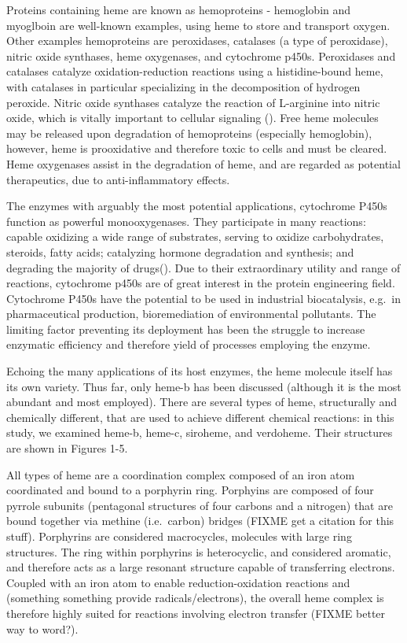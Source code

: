 \documentclass[a4paper, nobind]{templates/ociamthesis}
\begin{document}
Proteins containing heme are known as hemoproteins - hemoglobin and myoglboin are well-known examples, using heme to store and transport oxygen. Other examples hemoproteins are peroxidases, catalases (a type of peroxidase), nitric oxide synthases, heme oxygenases, and cytochrome p450s. Peroxidases and catalases catalyze oxidation-reduction reactions using a histidine-bound heme, with catalases in particular specializing in the decomposition of hydrogen peroxide. Nitric oxide synthases catalyze the reaction of L-arginine into nitric oxide, which is vitally important to cellular signaling (\textcite{Poulos2014}). Free heme molecules may be released upon degradation of hemoproteins (especially hemoglobin), however, heme is prooxidative and therefore toxic to cells and must be cleared. Heme oxygenases assist in the degradation of heme, and are regarded as potential therapeutics, due to anti-inflammatory effects\autocite{Araujo2012}.

The enzymes with arguably the most potential applications, cytochrome P450s function as powerful monooxygenases. They participate in many reactions: capable oxidizing a wide range of substrates, serving to oxidize carbohydrates, steroids, fatty acids; catalyzing hormone degradation and synthesis; and degrading the majority of drugs(\textcite{Poulos2014}). Due to their extraordinary utility and range of reactions, cytochrome p450s are of great interest in the protein engineering field. Cytochrome P450s have the potential to be used in industrial biocatalysis, e.g.~in pharmaceutical production, bioremediation of environmental pollutants\autocite{Du2017,Lalonde2016}. The limiting factor preventing its deployment has been the struggle to increase enzymatic efficiency and therefore yield of processes employing the enzyme\autocite{Girvan2016,Li2020}.

Echoing the many applications of its host enzymes, the heme molecule itself has its own variety. Thus far, only heme-b has been discussed (although it is the most abundant and most employed). There are several types of heme, structurally and chemically different, that are used to achieve different chemical reactions: in this study, we examined heme-b, heme-c, siroheme, and verdoheme. Their structures are shown in Figures 1-5.

All types of heme are a coordination complex composed of an iron atom coordinated and bound to a porphyrin ring. Porphyins are composed of four pyrrole subunits (pentagonal structures of four carbons and a nitrogen) that are bound together via methine (i.e.~carbon) bridges (FIXME get a citation for this stuff). Porphyrins are considered macrocycles, molecules with large ring structures. The ring within porphyrins is heterocyclic, and considered aromatic, and therefore acts as a large resonant structure capable of transferring electrons. Coupled with an iron atom to enable reduction-oxidation reactions and (something something provide radicals/electrons), the overall heme complex is therefore highly suited for reactions involving electron transfer (FIXME better way to word?).
\end{document}
